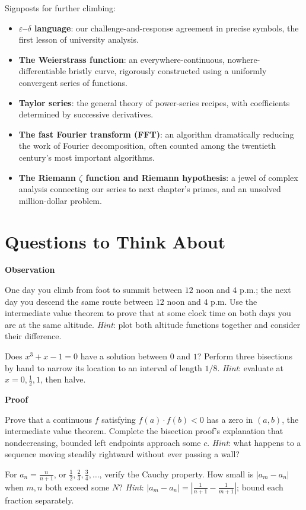 \begin{pandeng}
Signposts for further climbing:

\begin{itemize}
  \item \textbf{$\varepsilon$--$\delta$ language}: our challenge-and-response agreement in precise symbols, the first lesson of university analysis.
  \item \textbf{The Weierstrass function}: an everywhere-continuous, nowhere-differentiable bristly curve, rigorously constructed using a uniformly convergent series of functions.
  \item \textbf{Taylor series}: the general theory of power-series recipes, with coefficients determined by successive derivatives.
  \item \textbf{The fast Fourier transform (FFT)}: an algorithm dramatically reducing the work of Fourier decomposition, often counted among the twentieth century's most important algorithms.
  \item \textbf{The Riemann $\zeta$ function and Riemann hypothesis}: a jewel of complex analysis connecting our series to next chapter's primes, and an unsolved million-dollar problem.
\end{itemize}
\end{pandeng}

\section*{Questions to Think About}

\textbf{Observation}
\begin{sikao}
  \item One day you climb from foot to summit between $12$ noon and $4$ p.m.; the next day you descend the same route between $12$ noon and $4$ p.m. Use the intermediate value theorem to prove that at some clock time on both days you are at the same altitude. \emph{Hint}: plot both altitude functions together and consider their difference.
  \item Does $x^3+x-1=0$ have a solution between $0$ and $1$? Perform three bisections by hand to narrow its location to an interval of length $1/8$. \emph{Hint}: evaluate at $x=0,\frac12,1$, then halve.
\end{sikao}

\textbf{Proof}
\begin{sikao}
  \setcounter{sikaoi}{2}
  \item Prove that a continuous $f$ satisfying $f(a)\cdot f(b)<0$ has a zero in $(a,b)$, the intermediate value theorem. Complete the bisection proof's explanation that nondecreasing, bounded left endpoints approach some $c$. \emph{Hint}: what happens to a sequence moving steadily rightward without ever passing a wall?
  \item For $a_n=\frac{n}{n+1}$, or $\frac12,\frac23,\frac34,\dots$, verify the Cauchy property. How small is $|a_m-a_n|$ when $m,n$ both exceed some $N$? \emph{Hint}: $|a_m-a_n|=\left|\frac{1}{n+1}-\frac{1}{m+1}\right|$; bound each fraction separately.
\end{sikao}

